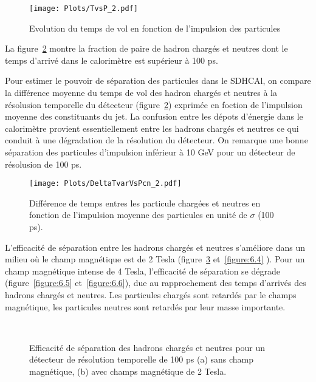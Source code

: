 \begin{figure}[H]
  \centering
  \texttt{[image: Plots/TvsP\_2.pdf]}
  \caption{Evolution du temps de vol en fonction de l'impulsion des particules}
  \label{figure:6.1}
\end{figure}
La figure~\ref{figure:6.2} montre la fraction de paire de hadron chargés et neutres dont le temps d'arrivé dans le calorimètre est supérieur à 100 ps.
\par Pour estimer le pouvoir de s\'eparation des particules dans le SDHCAl, on compare la diff\'erence moyenne du temps de vol des hadron chargés et neutres à la r\'esolusion temporelle du d\'etecteur (figure~\ref{figure:6.2}) exprimée en foction de l'impulsion moyenne des constituants du jet. La confusion entre les dépots d'énergie dans le calorimètre provient essentiellement entre les hadrons chargés et neutres ce qui conduit à une dégradation de la résolution du détecteur. On remarque une bonne s\'eparation des particules d'impulsion inférieur \`a 10 GeV pour un d\'etecteur de r\'esolusion de 100 ps.
\vfill%
\begin{figure}[H]
  \centering
  \texttt{[image: Plots/DeltaTvarVsPcn\_2.pdf]}
  \caption{Diff\'erence de temps entres les particule charg\'ees et neutres en fonction de l'impulsion moyenne des particules en unit\'e de $\sigma$ (100 ps).}
  \label{figure:6.2}
\end{figure}
\vfill%
L'efficacité de séparation entre les hadrons chargés et neutres s'améliore dans un milieu où le champ magnétique est de 2 Tesla (figure~\ref{figure:6.3} et~\ref{figure:6.4} ). Pour un champ magnétique intense de 4 Tesla, l'efficacité de séparation se dégrade (figure~\ref{figure:6.5} et~\ref{figure:6.6}), due au rapprochement des temps d'arrivés des hadrons chargés et neutres. Les particules chargés sont retardés par le champs magnétique, les particules neutres sont retardés par leur masse importante.

\begin{figure}[H]
  \centering 
  \mbox{ }
  \caption{Efficacité de séparation des hadrons chargés et neutres pour un détecteur de résolution temporelle de 100 ps (a) sans champ magnétique, (b) avec champs magnétique de 2 Tesla.} 
  \label{figure:6.3}
\end{figure}

